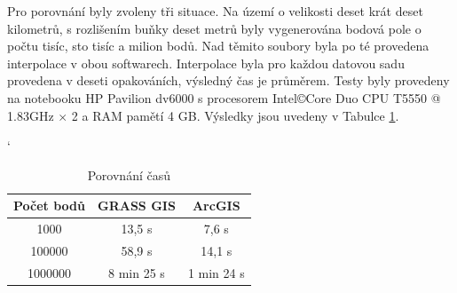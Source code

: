 \documentclass[12pt,a4paper]{article}
\begin{document}
Pro porovnání byly zvoleny tři situace. Na území o velikosti deset krát deset kilometrů, s rozlišením buňky deset metrů byly vygenerována bodová pole o počtu tisíc, sto tisíc a milion bodů. Nad těmito soubory byla po té provedena interpolace v obou softwarech. Interpolace byla pro každou datovou sadu provedena v deseti opakováních, výsledný čas je průměrem. Testy byly provedeny na notebooku HP Pavilion dv6000 s procesorem Intel\copyright  Core Duo CPU T5550 @ 1.83GHz $\times$ 2 a RAM pamětí 4 GB. Výsledky jsou uvedeny v Tabulce \ref{tab:GRASSxArc}.

\bigskip
\begin{table}[h]
\catcode`
\begin{tabular}{|c|c|c|}
\hline
Počet bodů & GRASS GIS  & ArcGIS     \\ \hline
1000       & 13,5 s     & 7,6 s      \\ \hline
100000     & 58,9 s     & 14,1 s     \\ \hline
1000000    & 8 min 25 s & 1 min 24 s \\ \hline
\end{tabular}
\caption{Porovnání časů}
\label{tab:GRASSxArc}
\end{table}

\newpage
\begin{figure}[h!]
\centering
\begin{floatrow}
\end{floatrow}
\end{figure}
\end{document}
